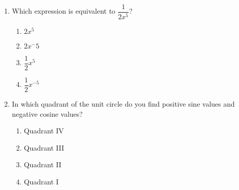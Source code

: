 \documentclass{article}
\begin{document}
\begin{enumerate}
\begin{enumerate}
 
  \end{enumerate}

\pagebreak
 
\item Which expression is equivalent to $\dfrac{1}{2x^5}$?

  \begin{enumerate}
  \item $2x^{5}$  
  \item $2x^-{5}$ 
  \item $\dfrac{1}{2}x^{5}$  
  \item $\dfrac{1}{2}x^{-5}$ %
  \end{enumerate}  

\item In which quadrant of the unit circle do you find positive sine values and negative cosine values?

  \begin{enumerate}
  \item Quadrant IV
  \item Quadrant III
  \item Quadrant II %
 
   \item Quadrant I
  \end{enumerate}


  


\end{enumerate}
\end{document}

